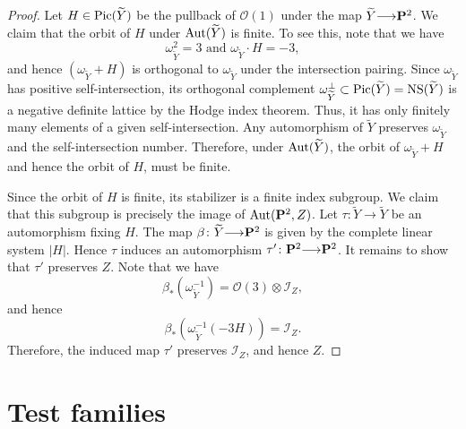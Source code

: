 \documentclass[12pt,reqno]{amsart}
\renewcommand{\to}{{\longrightarrow}}
\numberwithin{equation}{section}
\renewcommand{\O}{\mathcal O}
\begin{document}
\begin{proof}
  Let $H \in \operatorname{Pic}(\widetilde Y)$ be the pullback of $\O(1)$ under the map $\widetilde Y \to \P^2$.
  We claim that the orbit of $H$ under $\operatorname{Aut}(\widetilde Y)$ is finite.
  To see this, note that we have
  \[ \omega_{\widetilde Y}^2 = 3 \text{ and } \omega_{\widetilde Y} \cdot H = -3, \]
  and hence $(\omega_{\widetilde Y} + H)$ is orthogonal to $\omega_{\widetilde Y}$ under the intersection pairing.
  Since $\omega_{\widetilde Y}$ has positive self-intersection, its orthogonal complement $\omega_{\widetilde Y}^\perp \subset \operatorname{Pic}(\widetilde Y) = {\rm NS}(\widetilde Y)$ is a negative definite lattice by the Hodge index theorem.
  Thus, it has only finitely many elements of a given self-intersection.
  Any automorphism of $\widetilde Y$ preserves $\omega_{\widetilde Y}$ and the self-intersection number.
  Therefore, under $\operatorname{Aut}(\widetilde Y)$, the orbit of $\omega_{\widetilde Y} + H$ and hence the orbit of $H$, must be finite.

  Since the orbit of $H$ is finite, its stabilizer is a finite index subgroup.
  We claim that this subgroup is precisely the image of $\operatorname{Aut}({\bf P}^2, Z)$.
  Let $\tau \colon \widetilde Y \to \widetilde Y$ be an automorphism fixing $H$.
  The map $\beta \colon \widetilde Y \to \P^2$ is given by the complete linear system $|H|$.
  Hence $\tau$ induces an automorphism $\tau' \colon \P^2 \to \P^2$.
  It remains to show that $\tau'$ preserves $Z$.
  Note that we have
  \[ \beta_* \left(\omega_{\widetilde Y}^{-1}\right) = \O(3) \otimes \mathcal I_Z,\]
  and hence
  \[ \beta_* \left( \omega_{\widetilde Y}^{-1} (-3H) \right) = \mathcal I_Z.\]
  Therefore, the induced map $\tau'$ preserves $\mathcal I_Z$, and hence $Z$.
\end{proof}



\section{Test families}\label{sec:testfamilies}
\end{document}
